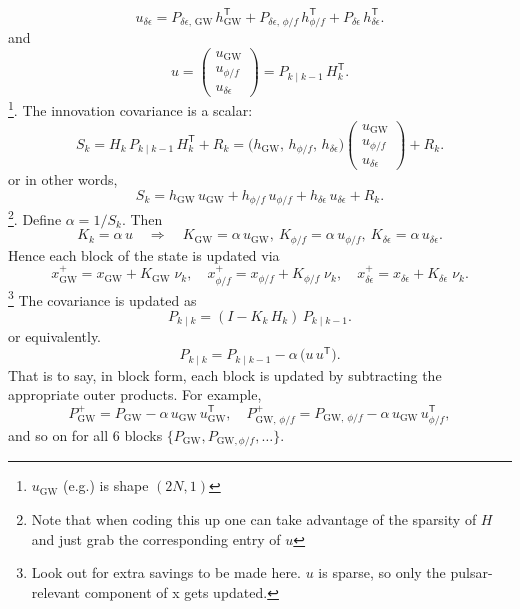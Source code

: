\documentclass{tufte-handout} %
\begin{document}
\begin{equation}
	u_{\delta\epsilon}
	=
	P_{\delta\epsilon,\,\mathrm{GW}}\,h_{\mathrm{GW}}^\mathsf{T}
	+
	P_{\delta\epsilon,\,\phi/f}\,h_{\phi/f}^\mathsf{T}
	+
	P_{\delta\epsilon}\,h_{\delta\epsilon}^\mathsf{T}.
\end{equation}
and
\begin{equation}
	u
	=
	\begin{pmatrix}
		u_{\mathrm{GW}}\\[3pt]
		u_{\phi/f}\\[3pt]
		u_{\delta\epsilon}
	\end{pmatrix}
	=
	P_{k\mid k-1}\,H_k^\mathsf{T}.
\end{equation}
\footnote{$u_{\mathrm{GW}}$ (e.g.) is shape $(2N,1)$}. The innovation covariance is a scalar:
\begin{equation}
	S_k
	=
	H_k\,P_{k\mid k-1}\,H_k^\mathsf{T} 
	+ 
	R_k
	=
	\bigl(h_{\mathrm{GW}},\,h_{\phi/f},\,h_{\delta\epsilon}\bigr)
	\begin{pmatrix}
		u_{\mathrm{GW}}\\
		u_{\phi/f}\\
		u_{\delta\epsilon}
	\end{pmatrix}
	+
	R_k.
\end{equation}
or in other words,
\begin{equation}
	S_k 
	=
	h_{\mathrm{GW}}\,u_{\mathrm{GW}}
	+
	h_{\phi/f}\,u_{\phi/f}
	+
	h_{\delta\epsilon}\,u_{\delta\epsilon}
	+
	R_k.
\end{equation}
\footnote{Note that when coding this up one can take advantage of the sparsity of $H$ and just grab the corresponding entry of $u$}. 
Define $\alpha = 1/S_k$. Then
\begin{equation}
	K_k 
	= 
	\alpha\,u
	\quad\Longrightarrow\quad
	K_{\mathrm{GW}} = \alpha\,u_{\mathrm{GW}},~
	K_{\phi/f} = \alpha\,u_{\phi/f},~
	K_{\delta\epsilon} = \alpha\,u_{\delta\epsilon}.
\end{equation}
Hence each block of the state is updated via
\begin{equation}
	x_{\mathrm{GW}}^+
	=
	x_{\mathrm{GW}}
	+
	K_{\mathrm{GW}}\;\nu_k,
	\quad
	x_{\phi/f}^+
	=
	x_{\phi/f}
	+
	K_{\phi/f}\;\nu_k,
	\quad
	x_{\delta\epsilon}^+
	=
	x_{\delta\epsilon}
	+
	K_{\delta\epsilon}\;\nu_k.
\end{equation}	
\footnote{Look out for extra savings to be made here. $u$ is sparse, so only the pulsar-relevant component of x gets updated. }
The covariance is updated as 
\begin{equation}
P_{k\mid k}
=
(I - K_k\,H_k)\,P_{k\mid k-1}.
\end{equation}
or equivalently.
\begin{equation}
	P_{k\mid k}
	=
	P_{k\mid k-1}
	-
	\alpha
	\,
	\bigl(u\,u^\mathsf{T}\bigr).
\end{equation}
That is to say, in block form, each block is updated by subtracting the appropriate outer products. For example,
\[
P_{\mathrm{GW}}^+
=
P_{\mathrm{GW}}
-
\alpha\,u_{\mathrm{GW}}\,u_{\mathrm{GW}}^\mathsf{T},
\quad
P_{\mathrm{GW},\,\phi/f}^+
=
P_{\mathrm{GW},\,\phi/f}
-
\alpha\,u_{\mathrm{GW}}\,u_{\phi/f}^\mathsf{T},
\]
and so on for all 6 blocks \(\{P_{\mathrm{GW}},P_{\mathrm{GW},\phi/f},\ldots\}\).
\end{document}
